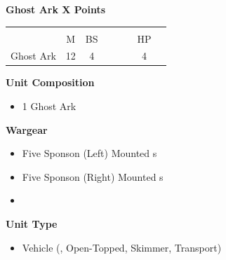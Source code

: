 \newpage
\subsubsection[Ghost Ark]{}
\hspace{0.5em}
\begin{minipage}[t]{0.72\textwidth}
	{\large \textbf{Ghost Ark \dotfill X Points}}
	\begin{NiceTabular}{m{145 pt} *{2}{c} | *{3}{c} | c | c }
		& & &  & & & &  \\
		& M & BS &  &  &  & HP &  \\
		\hline
		Ghost Ark & 12 & 4 &  &  &  & 4 & \\
	\end{NiceTabular}
	\small
	\begin{minipage}[t]{0.5\textwidth}
		\begin{flushleft}
			\vspace*{2em}
			\textbf{Unit Composition}
			\begin{itemize}
				\item 1 Ghost Ark
			\end{itemize}
			
			\textbf{Wargear}
			\begin{itemize}
				\item Five Sponson (Left) Mounted s
				\item Five Sponson (Right) Mounted s
				\item {}
			\end{itemize}
		\end{flushleft}
	\end{minipage}
	\begin{minipage}[t]{0.5\textwidth}
		\begin{flushleft}
			\vspace*{2em}
			\textbf{Unit Type}
			\begin{itemize}
				\item Vehicle (, Open-Topped, Skimmer, Transport)
			\end{itemize}
			

\end{flushleft}
\end{minipage}
\end{minipage}
